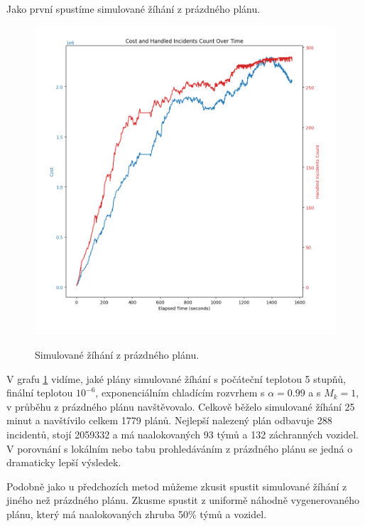 Jako první spustíme simulované žíhání z prázdného plánu.

\begin{figure}[H]
  \caption{Simulované žíhání z prázdného plánu.}
  \includegraphics[width=\textwidth]{img/plots/sa_empty.png}
  \centering
  \label{img:sa_empty}
\end{figure}

V grafu \ref{img:sa_empty} vidíme, jaké plány simulované žíhání
s počáteční teplotou 5 stupňů, finální teplotou $10^{-6}$, exponenciálním chladícím rozvrhem s $\alpha = 0.99$ a s $M_k = 1$,
v průběhu z prázdného plánu navštěvovalo.
Celkově běželo simulované žíhání 25 minut a navštívilo celkem 1779 plánů.
Nejlepší nalezený plán odbavuje 288 incidentů, stojí 2059332 a má naalokovaných 93 týmů a 132 záchranných vozidel.
V porovnání s lokálním nebo tabu prohledáváním z prázdného plánu se jedná o dramaticky lepší výsledek.

Podobně jako u předchozích metod můžeme zkusit spustit simulované žíhání z jiného než prázdného plánu.
Zkusme spustit z uniformě náhodně vygenerovaného plánu, který má naalokovaných zhruba 50\% týmů a vozidel.

